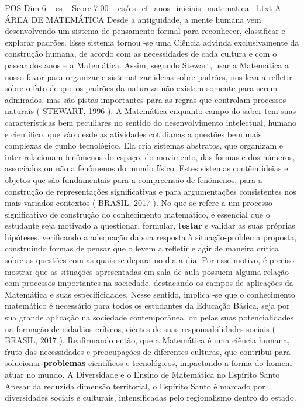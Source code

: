\begin{textsample}{POS Dim 6 – es – Score 7.00 – es/es\_ef\_anos\_iniciais\_matematica\_1.txt}  \label{ex:f6_pos_147}
A ÁREA DE MATEMÁTICA Desde a antiguidade, a mente humana vem desenvolvendo um sistema de pensamento formal para reconhecer, classificar e explorar padrões.
Esse sistema tornou -se uma Ciência advinda exclusivamente da construção humana, de acordo com as necessidades de cada cultura e com o passar dos anos – a Matemática.
Assim, segundo Stewart, usar a Matemática a nosso favor para organizar e sistematizar ideias sobre padrões, nos leva a refletir sobre o fato de que os padrões da natureza não existem somente para serem admirados, mas são pistas importantes para as regras que controlam processos naturais ( STEWART, 1996 ).
A Matemática enquanto campo do saber tem suas características bem peculiares no sentido do desenvolvimento intelectual, humano e científico, que vão desde as atividades cotidianas a questões bem mais complexas de cunho tecnológico.
Ela cria sistemas abstratos, que organizam e inter-relacionam fenômenos do espaço, do movimento, das formas e dos números, associados ou não a fenômenos do mundo físico.
Estes sistemas contêm ideias e objetos que são fundamentais para a compreensão de fenômenos, para a construção de representações significativas e para argumentações consistentes nos mais variados contextos ( BRASIL, 2017 ).
No que se refere a um processo significativo de construção do conhecimento matemático, é essencial que o estudante seja motivado a questionar, formular, \textbf{testar} e validar as suas próprias hipóteses, verificando a adequação da sua resposta à situação-problema proposta, construindo formas de pensar que o levem a refletir e agir de maneira crítica sobre as questões com as quais se depara no dia a dia.
Por esse motivo, é preciso mostrar que as situações apresentadas em sala de aula possuem alguma relação com processos importantes na sociedade, destacando os campos de aplicações da Matemática e suas especificidades.
Nesse sentido, implica -se que o conhecimento matemático é necessário para todos os estudantes da Educação Básica, seja por sua grande aplicação na sociedade contemporânea, ou pelas suas potencialidades na formação de cidadãos críticos, cientes de suas responsabilidades sociais ( BRASIL, 2017 ).
Reafirmando então, que a Matemática é uma ciência humana, fruto das necessidades e preocupações de diferentes culturas, que contribui para solucionar \textbf{problemas} científicos e tecnológicos, impactando a forma do homem atuar no mundo.
A Diversidade e o Ensino de Matemática no Espírito Santo Apesar da reduzida dimensão territorial, o Espírito Santo é marcado por diversidades sociais e culturais, intensificadas pelo regionalismo dentro do estado.

\end{textsample}
